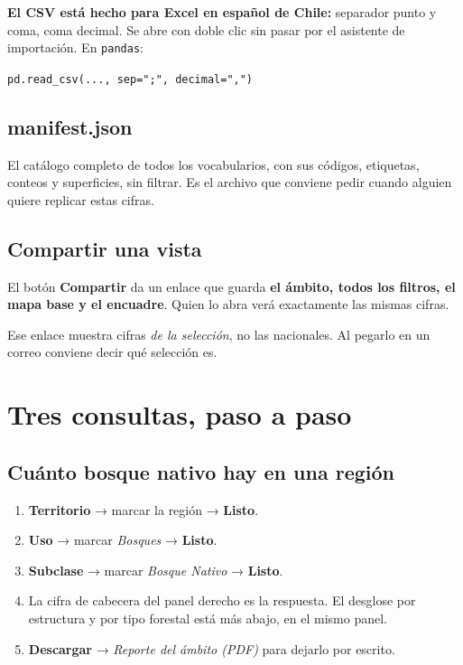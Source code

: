 \documentclass[11pt,a4paper]{report}
\newcommand{\campo}[1]{\textcolor{conaf}{\textbf{#1}}}
\newcommand{\orig}[1]{\texttt{\small #1}}
\begin{document}
\begin{nota}
\campo{El CSV está hecho para Excel en español de Chile:} separador punto y
coma, coma decimal. Se abre con doble clic sin pasar por el asistente de
importación. En \texttt{pandas}:

\begin{center}
\orig{pd.read\_csv(..., sep=";", decimal=",")}
\end{center}
\end{nota}

\section{manifest.json}
El catálogo completo de todos los vocabularios, con sus códigos, etiquetas,
conteos y superficies, sin filtrar. Es el archivo que conviene pedir cuando
alguien quiere replicar estas cifras.

\section{Compartir una vista}

El botón \campo{Compartir} da un enlace que guarda \campo{el ámbito, todos los
filtros, el mapa base y el encuadre}. Quien lo abra verá exactamente las mismas
cifras.

\begin{alerta}
Ese enlace muestra cifras \emph{de la selección}, no las nacionales. Al pegarlo
en un correo conviene decir qué selección es.
\end{alerta}

\chapter{Tres consultas, paso a paso}

\section{Cuánto bosque nativo hay en una región}
\begin{enumerate}
  \item \campo{Territorio} → marcar la región → \campo{Listo}.
  \item \campo{Uso} → marcar \emph{Bosques} → \campo{Listo}.
  \item \campo{Subclase} → marcar \emph{Bosque Nativo} → \campo{Listo}.
  \item La cifra de cabecera del panel derecho es la respuesta. El desglose por
        estructura y por tipo forestal está más abajo, en el mismo panel.
  \item \campo{Descargar} → \emph{Reporte del ámbito (PDF)} para dejarlo por escrito.
\end{enumerate}
\end{document}
